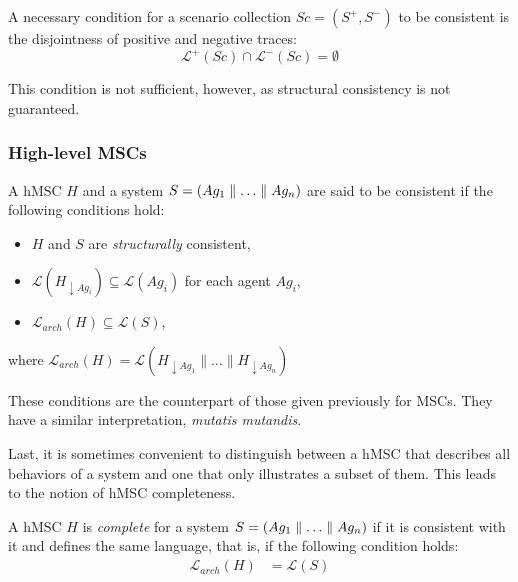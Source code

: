 A necessary condition for a scenario collection $Sc = (S^+,S^-)$ to be consistent is the disjointness of positive and negative traces:
\begin{equation}
\mathcal{L}^+(Sc) \cap \mathcal{L}^-(Sc) = \emptyset
\end{equation}

This condition is not sufficient, however, as structural consistency is not guaranteed.

\subsubsection*{High-level MSCs}

A hMSC $H$ and a system $S = (Ag_1 \parallel \ldots \parallel Ag_n)$ are said to be consistent if the following conditions hold:
\begin{itemize}
\item $H$ and $S$ are \emph{structurally} consistent,
\item $\mathcal{L}(H_{\downarrow Ag_i}) \subseteq \mathcal{L}(Ag_i)$ for each agent $Ag_i$,
\item $\mathcal{L}_{arch}(H) \subseteq \mathcal{L}(S)$,
\end{itemize}
where $\mathcal{L}_{arch}(H) = \mathcal{L}(H_{\downarrow Ag_1} \parallel \ldots \parallel H_{\downarrow Ag_n})$

These conditions are the counterpart of those given previously for MSCs. They have a similar interpretation, \emph{mutatis mutandis}. 

Last, it is sometimes convenient to distinguish between a hMSC that describes all behaviors of a system and one that only illustrates a subset of them. This leads to the notion of hMSC completeness. 

A hMSC $H$ is \emph{complete} for a system $S = (Ag_1 \parallel \ldots \parallel Ag_n)$ if it is consistent with it and defines the same language, that is, if the following condition holds:
\begin{align}
\mathcal{L}_{arch}(H) &= \mathcal{L}(S)
\end{align}

